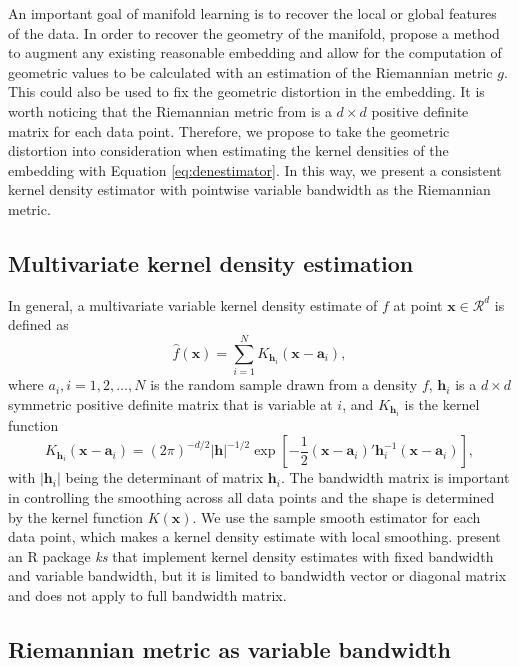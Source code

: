 \documentclass[11pt,a4paper,]{article}
\begin{document}
An important goal of manifold learning is to recover the local or global features of the data. In order to recover the geometry of the manifold, \textcite{Perrault-Joncas2013-pq} propose a method to augment any existing reasonable embedding and allow for the computation of geometric values to be calculated with an estimation of the Riemannian metric \(g\). This could also be used to fix the geometric distortion in the embedding. It is worth noticing that the Riemannian metric from \textcite{Perrault-Joncas2013-pq} is a \(d\times d\) positive definite matrix for each data point. Therefore, we propose to take the geometric distortion into consideration when estimating the kernel densities of the embedding with Equation \eqref{eq:denestimator}. In this way, we present a consistent kernel density estimator with pointwise variable bandwidth as the Riemannian metric.

\hypertarget{multivariate-kernel-density-estimation}{%
\subsection{Multivariate kernel density estimation}\label{multivariate-kernel-density-estimation}}

In general, a multivariate variable kernel density estimate of \(f\) at point \(\pmb{x} \in \mathcal{R}^d\) is defined as
\[
\hat{f}(\pmb{x})=\sum\limits_{i=1}^N K_{\pmb{h}_i}(\pmb{x}-\pmb{a}_i),
\]
where \(a_i, i = 1, 2, \dots, N\) is the random sample drawn from a density \(f\), \(\pmb{h}_i\) is a \(d\times d\) symmetric positive definite matrix that is variable at \(i\), and \(K_{\pmb{h}_i}\) is the kernel function
\[
K_{\pmb{h}_i}(\pmb{x}-\pmb{a}_i)=(2\pi)^{-d/2}|\pmb{h}|^{-1/2}\exp\left[-\frac{1}{2}(\pmb{x}-\pmb{a}_i)'\pmb{h}_i^{-1}(\pmb{x}-\pmb{a}_i)\right],
\]
with \(|\pmb{h}_i|\) being the determinant of matrix \(\pmb{h}_i\). The bandwidth matrix is important in controlling the smoothing across all data points and the shape is determined by the kernel function \(K(\pmb{x})\). We use the sample smooth estimator for each data point, which makes a kernel density estimate with local smoothing.
\textcite{Duong2007-up} present an R package \emph{ks} that implement kernel density estimates with fixed bandwidth and variable bandwidth, but it is limited to bandwidth vector or diagonal matrix and does not apply to full bandwidth matrix.

\hypertarget{riemannian-metric-as-variable-bandwidth}{%
\subsection{Riemannian metric as variable bandwidth}\label{riemannian-metric-as-variable-bandwidth}}
\end{document}

